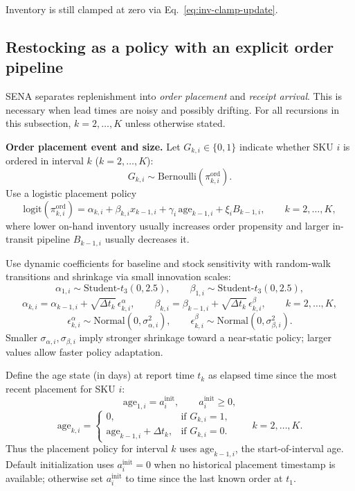 \documentclass[11pt]{article}
\begin{document}
Inventory is still clamped at zero via Eq.~\eqref{eq:inv-clamp-update}.

\subsection{Restocking as a policy with an explicit order pipeline}

SENA separates replenishment into \emph{order placement} and \emph{receipt arrival}. This is necessary when lead times are noisy and possibly drifting.
For all recursions in this subsection, $k=2,\dots,K$ unless otherwise stated.

\textbf{Order placement event and size.} Let $G_{k,i}\in\{0,1\}$ indicate whether SKU $i$ is ordered in interval $k$ ($k=2,\dots,K$):
\[
  G_{k,i} \sim \text{Bernoulli}(\pi^{\mathrm{ord}}_{k,i}).
\]
Use a logistic placement policy
\[
  \text{logit}(\pi^{\mathrm{ord}}_{k,i}) = \alpha_{k,i} + \beta_{k,i} x_{k-1,i} + \gamma_i\,\text{age}_{k-1,i} + \xi_i B_{k-1,i},\qquad k=2,\dots,K,
\]
where lower on-hand inventory usually increases order propensity and larger in-transit pipeline $B_{k-1,i}$ usually decreases it.

Use dynamic coefficients for baseline and stock sensitivity with random-walk transitions and shrinkage via small innovation scales:
\[
  \alpha_{1,i}\sim\text{Student-}t_3(0,2.5),\qquad \beta_{1,i}\sim\text{Student-}t_3(0,2.5),
\]
\[
  \alpha_{k,i}=\alpha_{k-1,i}+\sqrt{\Delta t_k}\,\epsilon^{\alpha}_{k,i},\qquad
  \beta_{k,i}=\beta_{k-1,i}+\sqrt{\Delta t_k}\,\epsilon^{\beta}_{k,i},\qquad k=2,\dots,K,
\]
\[
  \epsilon^{\alpha}_{k,i}\sim\text{Normal}(0,\sigma^2_{\alpha,i}),\qquad
  \epsilon^{\beta}_{k,i}\sim\text{Normal}(0,\sigma^2_{\beta,i}).
\]
Smaller $\sigma_{\alpha,i},\sigma_{\beta,i}$ imply stronger shrinkage toward a near-static policy; larger values allow faster policy adaptation.

Define the age state (in days) at report time $t_k$ as elapsed time since the most recent placement for SKU $i$:
\[
  \text{age}_{1,i}=a^{\text{init}}_i,\qquad a^{\text{init}}_i\ge 0,
\]
\[
  \text{age}_{k,i}=
  \begin{cases}
    0, & \text{if } G_{k,i}=1,\\
    \text{age}_{k-1,i}+\Delta t_k, & \text{if } G_{k,i}=0.
  \end{cases}\qquad k=2,\dots,K.
\]
Thus the placement policy for interval $k$ uses $\text{age}_{k-1,i}$, the start-of-interval age.
Default initialization uses $a^{\text{init}}_i=0$ when no historical placement timestamp is available; otherwise set $a^{\text{init}}_i$ to time since the last known order at $t_1$.
\end{document}
